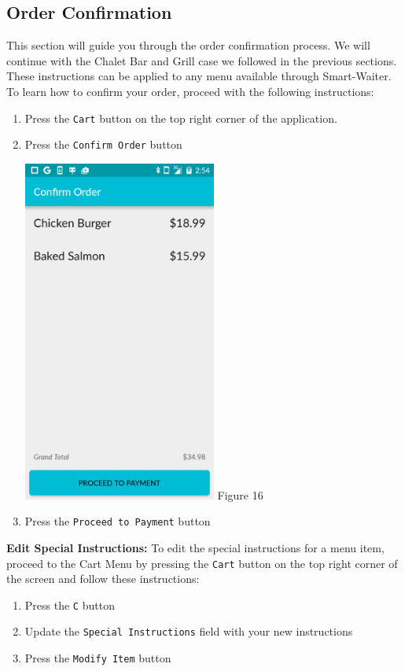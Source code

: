 \documentclass[12pt, titlepage]{article}
\begin{document}
\subsection{Order Confirmation}
This section will guide you through the order confirmation process. We will continue with the Chalet Bar and Grill case we followed in the previous sections. These instructions can be applied to any menu available through Smart-Waiter. To learn how to confirm your order, proceed with the following instructions:

	\begin{enumerate}
		\item Press the \texttt{Cart} button on the top right corner of the 			application.
		\item Press the \texttt{Confirm Order} button
		\begin{center}
			\includegraphics[width=0.5\textwidth]{confirm-order.png}
			\linebreak Figure 16
		\end{center}
		\item Press the \texttt{Proceed to Payment} button
	\end{enumerate}
	
	\textbf{Edit Special Instructions:}
	To edit the special instructions for a menu item, proceed to the Cart Menu by pressing the \texttt{Cart} button on the top right corner of the screen and follow these instructions:
	
	\begin{enumerate}
		\item Press the \texttt{C} button
		\item Update the \texttt{Special Instructions} field with your new instructions
		\item Press the \texttt{Modify Item} button
	\end{enumerate}
	
\end{document}
